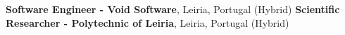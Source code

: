 %
%
%
\vspace{-0.5em}
\vspace{0.5em}

\begin{scholarship}
	{\textbf{Software Engineer - Void Software}, Leiria, Portugal (Hybrid)}
	{\textbf{Scientific Researcher - Polytechnic of Leiria}, Leiria, Portugal (Hybrid)}
\end{scholarship}

\vspace{1em}
